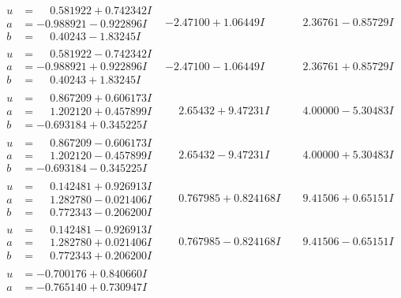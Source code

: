 \documentclass[1p]{elsarticle_modified}
\theoremstyle{definition}
\begin{document}
$$\begin{array}{c|c|c}
\begin{aligned}
u &= \phantom{-}0.581922 + 0.742342 I \\
a &= -0.988921 - 0.922896 I \\
b &= \phantom{-}0.40243 - 1.83245 I\end{aligned}
 & -2.47100 + 1.06449 I & \phantom{-}2.36761 - 0.85729 I \\ \hline\begin{aligned}
u &= \phantom{-}0.581922 - 0.742342 I \\
a &= -0.988921 + 0.922896 I \\
b &= \phantom{-}0.40243 + 1.83245 I\end{aligned}
 & -2.47100 - 1.06449 I & \phantom{-}2.36761 + 0.85729 I \\ \hline\begin{aligned}
u &= \phantom{-}0.867209 + 0.606173 I \\
a &= \phantom{-}1.202120 + 0.457899 I \\
b &= -0.693184 + 0.345225 I\end{aligned}
 & \phantom{-}2.65432 + 9.47231 I & \phantom{-}4.00000 - 5.30483 I \\ \hline\begin{aligned}
u &= \phantom{-}0.867209 - 0.606173 I \\
a &= \phantom{-}1.202120 - 0.457899 I \\
b &= -0.693184 - 0.345225 I\end{aligned}
 & \phantom{-}2.65432 - 9.47231 I & \phantom{-}4.00000 + 5.30483 I \\ \hline\begin{aligned}
u &= \phantom{-}0.142481 + 0.926913 I \\
a &= \phantom{-}1.282780 - 0.021406 I \\
b &= \phantom{-}0.772343 - 0.206200 I\end{aligned}
 & \phantom{-}0.767985 + 0.824168 I & \phantom{-}9.41506 + 0.65151 I \\ \hline\begin{aligned}
u &= \phantom{-}0.142481 - 0.926913 I \\
a &= \phantom{-}1.282780 + 0.021406 I \\
b &= \phantom{-}0.772343 + 0.206200 I\end{aligned}
 & \phantom{-}0.767985 - 0.824168 I & \phantom{-}9.41506 - 0.65151 I \\ \hline\begin{aligned}
u &= -0.700176 + 0.840660 I \\
a &= -0.765140 + 0.730947 I \\

\end{aligned}
\end{array}$$
\end{document}

